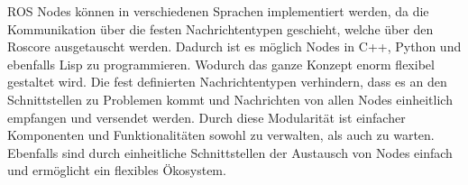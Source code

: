 \newline
ROS Nodes können in verschiedenen Sprachen implementiert werden, da die Kommunikation über die festen Nachrichtentypen geschieht, welche über den Roscore ausgetauscht werden. Dadurch ist es möglich Nodes in C++, Python und ebenfalls Lisp zu programmieren. Wodurch das ganze Konzept enorm flexibel gestaltet wird. Die fest definierten Nachrichtentypen verhindern, dass es an den Schnittstellen zu Problemen kommt und Nachrichten von allen Nodes einheitlich empfangen und versendet werden. \newline
Durch diese Modularität ist einfacher Komponenten und Funktionalitäten sowohl zu verwalten, als auch zu warten. Ebenfalls sind durch einheitliche Schnittstellen der Austausch von Nodes einfach und ermöglicht ein flexibles Ökosystem.



